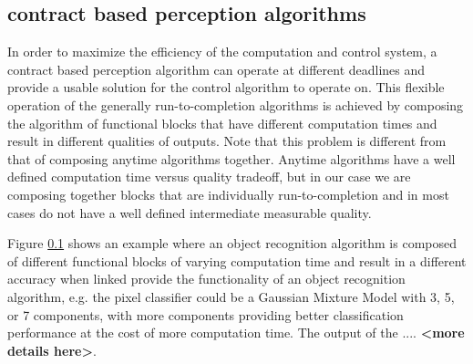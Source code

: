 \subsection{contract based perception algorithms}

In order to maximize the efficiency of the computation and control system, a contract based perception algorithm can operate at different deadlines and provide a usable solution for the control algorithm to operate on. This flexible operation of the generally run-to-completion algorithms is achieved by composing the algorithm of functional blocks that have different computation times and result in different qualities of outputs. Note that this problem is different from that of composing anytime algorithms together. Anytime algorithms have a well defined computation time versus quality tradeoff, but in our case we are composing together blocks that are individually run-to-completion and in most cases do not have a well defined intermediate measurable quality.

Figure \ref{} shows an example where an object recognition algorithm is composed of different functional blocks of varying computation time and result in a different accuracy when linked provide the functionality of an object recognition algorithm, e.g. the pixel classifier could be a Gaussian Mixture Model with 3, 5, or 7 components, with more components providing better classification performance at the cost of more computation time. The output of the .... \textbf{<more details here>}. 






